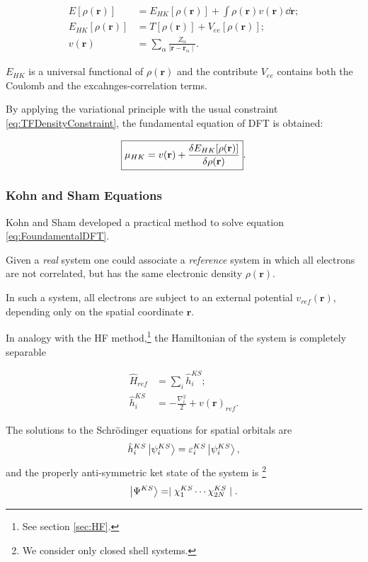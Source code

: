 \documentclass[a4paper,12pt]{article}
\newcommand\dens{\rho(\mathbf{r})}
\newcommand\erre{\mathbf{r}}
\begin{document}
\begin{align}
	E[\rho(\mathbf{r})] &= E_{HK}[\dens] + \int \rho(\mathbf{r}) v(\mathbf{r}) \dd{\mathbf{r}} ;\\
	E_{HK}[\dens] &= T[\rho(\mathbf{r})] + V_{ee}[\rho(\mathbf{r})] ;\\
	v(\mathbf{r}) &= \sum_{\alpha} \frac{Z_{\alpha}}{\mid \erre - \erre_{\alpha} \mid} \label{eq:electronionPotential}.
\end{align}

$E_{HK}$ is a universal functional of $\dens$ and the contribute $V_{ee}$ contains both the Coulomb and the excahnges-correlation terms.

By applying the variational principle with the usual constraint \eqref{eq:TFDensityConstraint}, the fundamental equation of DFT is obtained:

\begin{equation}\label{eq:FoundamentalDFT}
\boxed{
	\mu_{HK} = v(\erre) + \frac{\var{E_{HK}[\dens]}}{\var{\dens}}
}.
\end{equation}


\subsubsection{Kohn and Sham Equations}

Kohn and Sham \cite{KS} developed a practical method to solve equation \eqref{eq:FoundamentalDFT}.

Given a \textit{real} system one could associate a \textit{reference} system in which all electrons are not correlated, but has the same electronic density $\dens$.

In such a system, all electrons are subject to an external potential $v_{ref}(\erre)$, depending only on the spatial coordinate $\erre$.\footnotemark


In analogy with the HF method,\footnote{See section \ref{sec:HF}.} the Hamiltonian of the system is completely separable

\begin{align}
\hat{H}_{ref} &= \sum_{i} \hat{h}_i^{KS} ;\\
\hat{h}_i^{KS} &= - \frac{\nabla^{2}_{i}}{2} + v(\erre)_{ref} .
\end{align}

The solutions to the Schr\"odinger equations for spatial orbitals are
\begin{equation} \label{eq:RawKSeq}
	\hat{h}_i^{KS} \ket{\psi_{i}^{KS}} = \varepsilon_{i}^{KS} \ket{\psi_{i}^{KS}} ,
\end{equation}
and the properly anti-symmetric ket state of the system is \footnote{We consider only closed shell systems.}
\begin{equation}
	\ket{\Psi^{KS}} = \mid \chi_{1}^{KS} \cdots \chi_{2N}^{KS} \mid .
\end{equation}
\end{document}
